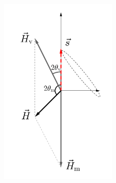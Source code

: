 \begin{figure}[htbp]
    \centering
    \includegraphics[width=0.5\textwidth]{chapters/assets/basics/matter-effect-notsolarge-density}
    \caption{}
    \label{chap:basics-sec:flavor-isospin-pic-fig:matter-effect-notsolarge-density}
\end{figure}




